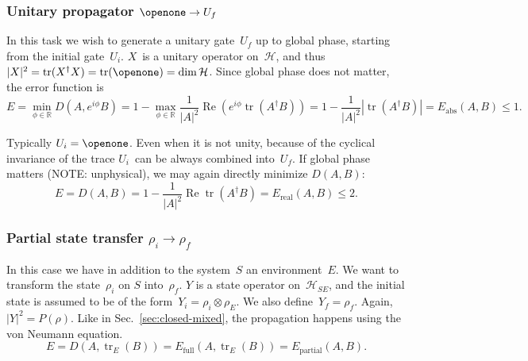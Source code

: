 \documentclass[aps, pra, a4paper, longbibliography, superscriptaddress]{revtex4-1}
\newcommand{\I}{\openone}
\newcommand{\be}{\begin{equation}}
\newcommand{\ee}{\end{equation}}
\newcommand{\R}{{\mathbb R}}  %
\newcommand{\hilb}[1]{\mathcal{#1}}
\DeclareMathOperator{\tr}{tr}
\DeclareMathOperator{\re}{Re}
\begin{document}
\subsubsection{Unitary propagator $\I \to U_f$}
\label{sec:closed-u}
In this task we wish to generate a unitary gate~$U_f$ up to global
phase, starting from the initial gate~$U_i$.
$X$~is a unitary operator on~$\hilb{H}$, and
thus $|X|^2 = \tr(X^\dagger X) = \tr(\I) = \dim \hilb{H}$.
Since global phase does not matter, the error function is
\be
E
= \min_{\phi \in \R} D(A, e^{i \phi} B)
= 1 -\max_{\phi \in \R} \frac{1}{|A|^2} \re \left( e^{i \phi} \tr(A^\dagger B)\right)
= 1 -\frac{1}{|A|^2}|\tr(A^\dagger B)|
= E_\text{abs}(A, B) \le 1.
\ee
\begin{comment}
We can also get rid of phase by explicitly lifting the problem into
Liouville space (see Eq.~\eqref{eq:L-unitary}),
$X = \hat{V} = V^* \otimes V$,
and then minimize the operator distance~$D(A, B)$.

Using Eq.~\eqref{eq:hat-product}, the norm squared is 
\be
|X|^2 = |\hat{V}|^2
= \tr(\hat{V}^\dagger \hat{V})
= |\tr(V^\dagger V)|^2
= |\tr(\I)|^2
= N^2.
\ee
This is constant, so (X1) holds and we may maximize the fidelity instead:
\be
f(A, B)
= \frac{1}{N^2} \re \tr \left(A^\dagger B \right)
= \frac{1}{N^2} (\re) \left| \tr \left(V_f^\dagger V_n \right) \right|^2.
\ee
It clearly obeys $0 \le f(A, B) \le 1$.
Much like in
Sec.~\ref{sec:closed-pure},
the problem simplifies back into Hilbert space, and we may equivalently
choose~$X = V$.
\end{comment}

Typically $U_i = \I$.
Even when it is not unity, because of the cyclical invariance of the trace $U_i$~can be always combined into~$U_f$.
If global phase matters (NOTE: unphysical), we may again directly minimize
$D(A, B)$:
\be
E
= D(A, B)
= 1 -\frac{1}{|A|^2} \re \tr(A^\dagger B)
= E_\text{real}(A, B) \le 2.
\ee




\subsubsection{Partial state transfer $\rho_i \to \rho_f$}

In this case we have in addition to the system~$S$ an environment~$E$.
We want to transform the state~$\rho_i$ on $S$ into~$\rho_f$.
$Y$ is a state operator on~$\hilb{H}_{SE}$, and
the initial state is assumed to be of the
form~$Y_i = \rho_i \otimes \rho_E$.
We also define~$Y_f = \rho_f$.
Again, $|Y|^2 = P(\rho)$.
Like in Sec.~\ref{sec:closed-mixed},
the propagation happens using the von Neumann equation.
\be
E
= D(A, \tr_E(B))
= E_\text{full}(A, \tr_E(B))
= E_\text{partial}(A, B).
\ee
\end{document}
